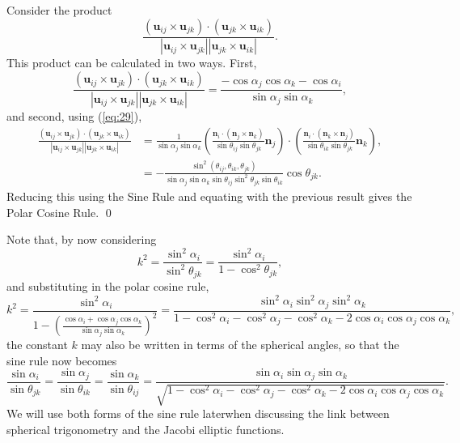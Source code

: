\documentclass[fleqn,11pt,twoside]{article}
\makeatletter
\renewenvironment{proof}[1][\proofname]{\par
  \normalfont
  \topsep6\p@\@plus6\p@ \trivlist
  \item[\hskip\labelsep\textbf{%
    #1\@addpunct{.}}]\ignorespaces
}{%
  \qed\endtrivlist
}
\theoremstyle{definition}
\makeatother
\begin{document}
\begin{proof}
Consider the product
\begin{equation}
\frac{(\textbf{u}_{ij}\times\textbf{u}_{jk})\cdot(\textbf{u}_{jk}\times\textbf{u}_{ik})}
{|\textbf{u}_{ij}\times\textbf{u}_{jk}||\textbf{u}_{jk}\times\textbf{u}_{ik}|}.
\end{equation}
This product can be calculated in two ways. First,
\begin{equation}
\frac{(\textbf{u}_{ij}\times\textbf{u}_{jk})\cdot(\textbf{u}_{jk}\times\textbf{u}_{ik})}
{|\textbf{u}_{ij}\times\textbf{u}_{jk}||\textbf{u}_{jk}\times\textbf{u}_{ik}|}=\frac{-\cos\alpha_j\cos\alpha_k-\cos\alpha_i}{\sin\alpha_j\sin\alpha_k}
,
\end{equation}
and second, using (\ref{eq:29}),
\begin{equation}
\begin{split}
\frac{(\textbf{u}_{ij}\times\textbf{u}_{jk})\cdot(\textbf{u}_{jk}\times\textbf{u}_{ik})}
{|\textbf{u}_{ij}\times\textbf{u}_{jk}||\textbf{u}_{jk}\times\textbf{u}_{ik}|}&=\frac{1}{\sin\alpha_j\sin\alpha_k}\left(\frac{\textbf{n}_i\cdot(\textbf{n}_j\times\textbf{n}_k)}{\sin\theta_{ij}\sin\theta_{jk}}\textbf{n}_j\right)\cdot \left(\frac{\textbf{n}_i\cdot(\textbf{n}_k\times\textbf{n}_j)}{\sin\theta_{ik}\sin\theta_{jk}}\textbf{n}_k\right),\\
&=-\frac{\sin^2(\theta_{ij},\theta_{ik},\theta_{jk})}{\sin\alpha_j\sin\alpha_k\sin\theta_{ij}\sin^2\theta_{jk}\sin\theta_{ik}}\cos\theta_{jk}.
\end{split}
\end{equation}
Reducing this using the Sine Rule and equating with the previous result gives the Polar Cosine Rule.
\end{proof}

Note that, by now considering
\begin{equation}
k^2=\frac{\sin^2\alpha_i}{\sin^2\theta_{jk}}
=\frac{\sin^2\alpha_i}{1-\cos^2\theta_{jk}},
\end{equation}
and substituting in the polar cosine rule,
\begin{equation}
k^2=\frac{\sin^2\alpha_i}{1-\left(\frac{\cos\alpha_i+\cos\alpha_j\cos\alpha_k}{\sin\alpha_j\sin\alpha_k}\right)^2}
=\frac{\sin^2\alpha_i\sin^2\alpha_j\sin^2\alpha_k}{1-\cos^2\alpha_i-\cos^2\alpha_j-\cos^2\alpha_k-2\cos\alpha_i\cos\alpha_j\cos\alpha_k},
\end{equation}
the constant $k$ may also be written in terms of the spherical angles, so that the sine rule now becomes
\begin{equation}\label{eq:ssine}
\frac{\sin\alpha_i}{\sin\theta_{jk}}=\frac{\sin\alpha_j}{\sin\theta_{ik}}=\frac{\sin\alpha_k}{\sin\theta_{ij}}=\frac{\sin\alpha_i\sin\alpha_j\sin\alpha_k}{\sqrt{1-\cos^2\alpha_i-\cos^2\alpha_j-\cos^2\alpha_k-2\cos\alpha_i\cos\alpha_j\cos\alpha_k}}.
\end{equation}
We will use both forms of the sine rule laterwhen discussing the link between spherical trigonometry 
and the Jacobi elliptic functions. 
\end{document}
